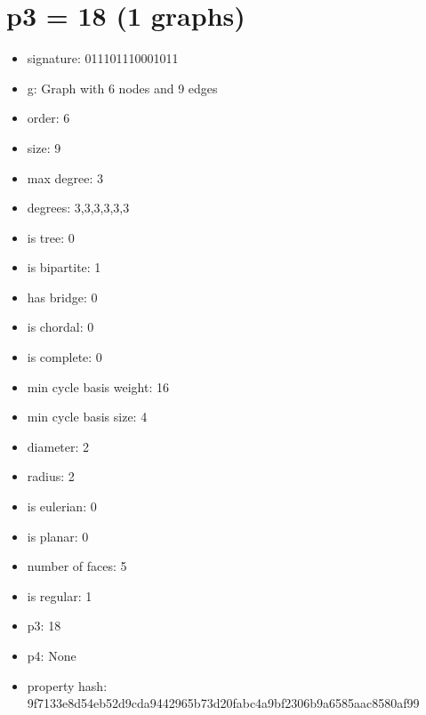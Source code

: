 \chapter{p3 = 18 (1 graphs)}
\newpage\begin{figure}
\end{figure}
\begin{itemize}
\item signature: 011101110001011
\item g: Graph with 6 nodes and 9 edges
\item order: 6
\item size: 9
\item max degree: 3
\item degrees: 3,3,3,3,3,3
\item is tree: 0
\item is bipartite: 1
\item has bridge: 0
\item is chordal: 0
\item is complete: 0
\item min cycle basis weight: 16
\item min cycle basis size: 4
\item diameter: 2
\item radius: 2
\item is eulerian: 0
\item is planar: 0
\item number of faces: 5
\item is regular: 1
\item p3: 18
\item p4: None
\item property hash: 9f7133e8d54eb52d9cda9442965b73d20fabc4a9bf2306b9a6585aac8580af99
\end{itemize}
\newpage
